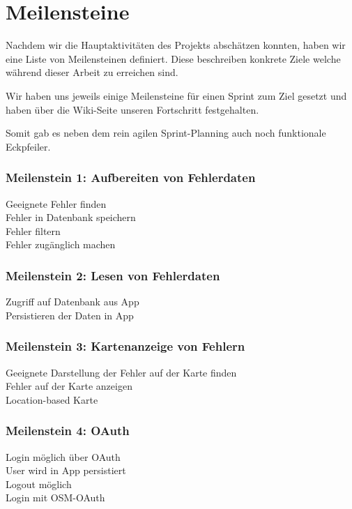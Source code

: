 \section{Meilensteine}
\label{meilensteine}

Nachdem wir die Hauptaktivitäten des Projekts abschätzen konnten, haben wir eine Liste von Meilensteinen definiert.
Diese beschreiben konkrete Ziele welche während dieser Arbeit zu erreichen sind.

Wir haben uns jeweils einige Meilensteine für einen Sprint zum Ziel gesetzt und haben über die Wiki-Seite unseren Fortschritt festgehalten.

Somit gab es neben dem rein agilen Sprint-Planning auch noch funktionale Eckpfeiler.

\subsubsection{Meilenstein 1: Aufbereiten von Fehlerdaten}
\tick Geeignete Fehler finden \\
\tick Fehler in Datenbank speichern \\
\tick Fehler filtern \\
\tick Fehler zugänglich machen

\subsubsection{Meilenstein 2: Lesen von Fehlerdaten}

\tick Zugriff auf Datenbank aus App \\
\tick Persistieren der Daten in App

\subsubsection{Meilenstein 3: Kartenanzeige von Fehlern}

\tick Geeignete Darstellung der Fehler auf der Karte finden \\
\tick Fehler auf der Karte anzeigen \\
\tick Location-based Karte

\subsubsection{Meilenstein 4: OAuth}

\tick Login möglich über OAuth \\
\tick User wird in App persistiert \\
\tick Logout möglich \\
\tick Login mit OSM-OAuth

